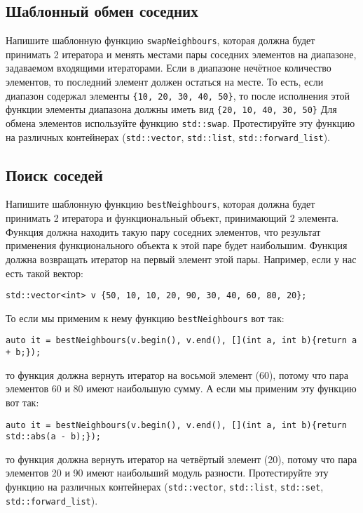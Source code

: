 \documentclass{article}
\begin{document}
\subsection{Шаблонный обмен соседних}
Напишите шаблонную функцию \texttt{swapNeighbours}, которая должна будет принимать 2 итератора и менять местами пары соседних элементов на диапазоне, задаваемом входящими итераторами. Если в диапазоне нечётное количество элементов, то последний элемент должен остаться на месте. То есть, если диапазон содержал элементы \texttt{\{10, 20, 30, 40, 50\}}, то после исполнения этой функции элементы диапазона должны иметь вид \texttt{\{20, 10, 40, 30, 50\}} Для обмена элементов используйте функцию \texttt{std::swap}. Протестируйте эту функцию на различных контейнерах (\texttt{std::vector}, \texttt{std::list}, \texttt{std::forward\_list}).


\subsection{Поиск соседей}
Напишите шаблонную функцию \texttt{bestNeighbours}, которая должна будет принимать 2 итератора и функциональный объект, принимающий 2 элемента. Функция должна находить такую пару соседних элементов, что результат применения функционального объекта к этой паре будет наибольшим. Функция должна возвращать итератор на первый элемент этой пары. Например, если у нас есть такой вектор:
\begin{lstlisting}
std::vector<int> v {50, 10, 10, 20, 90, 30, 40, 60, 80, 20};
\end{lstlisting}
То если мы применим к нему функцию  \texttt{bestNeighbours} вот так:
\begin{lstlisting}
auto it = bestNeighbours(v.begin(), v.end(), [](int a, int b){return a + b;});
\end{lstlisting}
то функция должна вернуть итератор на восьмой элемент (60), потому что пара элементов 60 и 80 имеют наибольшую сумму.
А если мы применим эту функцию вот так: 
\begin{lstlisting}
auto it = bestNeighbours(v.begin(), v.end(), [](int a, int b){return std::abs(a - b);});
\end{lstlisting}
то функция должна вернуть итератор на четвёртый элемент (20), потому что пара элементов 20 и 90 имеют наибольший модуль разности.
Протестируйте эту функцию на различных контейнерах (\texttt{std::vector}, \texttt{std::list}, \texttt{std::set}, \texttt{std::forward\_list}).
\end{document}
